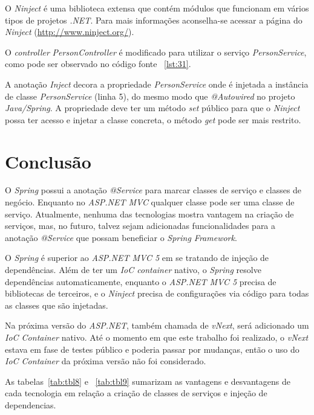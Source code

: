 O \textit{Ninject} é uma biblioteca extensa que contém módulos que funcionam em vários tipos de projetos \textit{.NET}. Para mais informações aconselha-se acessar a página do \textit{Ninject} (\url{http://www.ninject.org/}).

O \textit{controller} \textit{PersonController} é modificado para utilizar o serviço \textit{PersonService}, como pode ser observado no código fonte ~\ref{lst:31}.


A anotação \textit{Inject} decora a propriedade \textit{PersonService} onde é injetada a instância de classe \textit{PersonService} (linha 5), do mesmo modo que \textit{@Autowired} no projeto \textit{Java/Spring}. A propriedade deve ter um método \textit{set} público para que o \textit{Ninject} possa ter acesso e injetar a classe concreta, o método \textit{get} pode ser mais restrito.

\section{Conclusão}

O \textit{Spring} possui a anotação \textit{@Service} para marcar classes de serviço e classes de negócio. Enquanto no \textit{ASP.NET MVC} qualquer classe pode ser uma classe de serviço. Atualmente, nenhuma das tecnologias mostra vantagem na criação de serviços, mas, no futuro, talvez sejam adicionadas funcionalidades para a anotação \textit{@Service} que possam beneficiar o \textit{Spring Framework}.

O \textit{Spring} é superior ao \textit{ASP.NET MVC 5} em se tratando de injeção de dependências. Além de ter um \textit{IoC container} nativo, o \textit{Spring} resolve dependências automaticamente, enquanto o \textit{ASP.NET MVC 5} precisa de bibliotecas de terceiros, e o \textit{Ninject} precisa de configurações via código para todas as classes que são injetadas.

Na próxima versão do \textit{ASP.NET}, também chamada de \textit{vNext}, será adicionado um \textit{IoC Container} nativo. Até o momento em que este trabalho foi realizado, o \textit{vNext} estava em fase de testes público e poderia passar por mudanças, então o uso do \textit{IoC Container} da próxima versão não foi considerado.

As tabelas~\ref{tab:tbl8} e ~\ref{tab:tbl9} sumarizam as vantagens e desvantagens de cada tecnologia em relação a criação de classes de serviços e injeção de dependencias.

